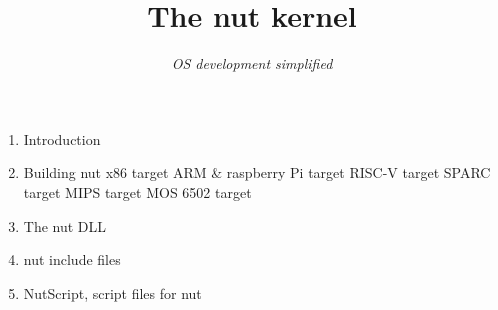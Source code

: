 \documentclass{article}
\title{The nut kernel}
\author{\textit{OS development simplified}}
\date{}
\begin{document}
  \maketitle
  \newpage

  \begin{enumerate}
  	\LARGE \item Introduction
  	\\
  	\LARGE \item Building nut
  	\Large \subitem x86 target
  	\Large \subitem ARM \& raspberry Pi target
  	\Large \subitem RISC-V target
  	\Large \subitem SPARC target
  	\Large \subitem MIPS target
  	\Large \subitem MOS 6502 target
  	\LARGE \item The nut DLL
  	\LARGE \item nut include files
  	\LARGE \item NutScript, script files for nut
  \end{enumerate}
\end{document}

